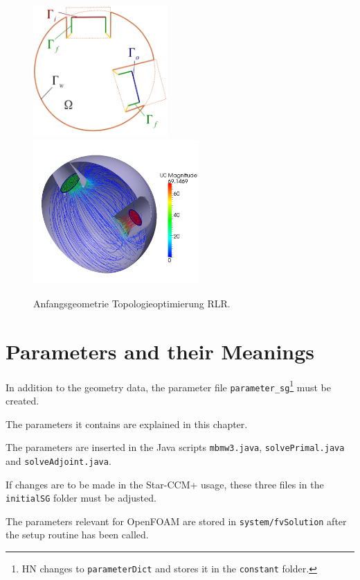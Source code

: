 \documentclass[a4paper,oneside]{book}
\numberwithin{equation}{section}
\begin{document}
\begin{figure}[htbp]
    \centering
    \includegraphics[height=5cm]{TopoStartgeometrieSkizze.png}
    \includegraphics[height=5.5cm]{TopoStartgeometrie.png}
    \caption{Anfangsgeometrie Topologieoptimierung RLR.}
    \label{fig:initialTopo}
\end{figure}


\chapter{Parameters and their Meanings}

In addition to the geometry data, the parameter file \verb|parameter_sg|\footnote{HN changes to \texttt{parameterDict} and stores it in the \texttt{constant} folder.} must be created.

The parameters it contains are explained in this chapter.

The parameters are inserted in the Java scripts \texttt{mbmw3.java}, \texttt{solvePrimal.java} and \texttt{solveAdjoint.java}.

If changes are to be made in the Star-CCM+ usage, these three files in the \texttt{initialSG} folder must be adjusted.

The parameters relevant for OpenFOAM are stored in \texttt{system/fvSolution} after the setup routine has been called.
\end{document}
